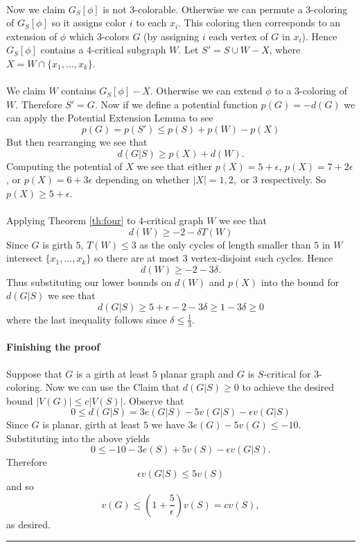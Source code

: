 \documentclass[letterpaper,12pt,oneside,onecolumn]{article}
\newenvironment{proof}{{\bf Proof:  }}{\hfill\rule{2mm}{2mm}}
\begin{document}
\begin{proof}
	\paragraph{}
	Now we claim $G_S[\phi]$ is not $3$-colorable. Otherwise we can permute a $3$-coloring of $G_S[\phi]$ so it assigns color $i$ to each $x_i$. This coloring then corresponds to an extension of $\phi$ which $3$-colors $G$ (by assigning $i$ each vertex of $G$ in $x_i$). Hence $G_S[\phi]$ contains a $4$-critical subgraph $W$. Let $S' = S \cup W - X$, where $X = W \cap \{x_1, \dots, x_k\}$.
	\paragraph{}
	We claim $W$ contains $G_S[\phi] - X$. Otherwise we can extend $\phi$ to a $3$-coloring of $W$. Therefore $S' = G$. Now if we define a potential function $p(G) = -d(G)$ we can apply the Potential Extension Lemma to see
	$$p(G) = p(S') \leq p(S) + p(W) - p(X)$$
	But then rearranging we see that
	$$d(G|S) \geq p(X) + d(W).$$
	Computing the potential of $X$ we see that either $p(X) = 5+\epsilon$, $p(X) = 7 + 2\epsilon$, or $p(X) = 6+3\epsilon$ depending on whether $|X| = 1, 2,$ or $3$ respectively. So $p(X) \geq 5+\epsilon$.
	\paragraph{}
	Applying Theorem \ref{th:four} to $4$-critical graph $W$ we see that
	$$d(W) \geq -2 - \delta T(W)$$
	Since $G$ is girth $5$, $T(W) \leq 3$ as the only cycles of length smaller than $5$ in $W$ intersect $\{x_1,\dots, x_k\}$ so there are at most $3$ vertex-disjoint such cycles. Hence
	$$d(W) \geq -2 - 3\delta.$$
	Thus substituting our lower bounds on $d(W)$ and $p(X)$ into the bound for $d(G|S)$ we see that
	$$d(G|S) \geq 5+\epsilon -2-3\delta \geq 1 - 3\delta \geq 0$$
	where the last inequality follows since $\delta \leq \frac{1}{3}$.
	\paragraph{Finishing the proof}
	Suppose that $G$ is a girth at least $5$ planar graph and $G$ is $S$-critical for $3$-coloring. Now we can use the Claim that $d(G|S) \geq 0$ to achieve the desired bound $|V(G)| \leq c|V(S)|$. Observe that
	$$0 \leq d(G|S) = 3e(G|S) -5v(G|S) -\epsilon v(G|S)$$
	Since $G$ is planar, girth at least $5$ we have $3e(G) -5v(G) \leq -10$. Substituting into the above yields
	$$0 \leq -10 -3e(S) +5v(S) - \epsilon v(G|S).$$ Therefore
	$$\epsilon v(G|S) \leq 5v(S)$$
	and so 
	$$v(G) \leq (1+\frac{5}{\epsilon}) v(S) = c v(S),$$
	as desired.
	\end{proof}
\end{document}
